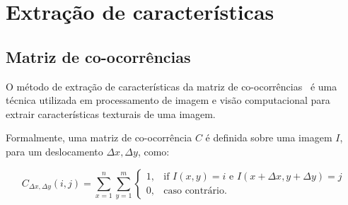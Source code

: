 \begin{figure}[h!]
        \captionsetup{width=12cm}
		\centering
\end{figure}
\FloatBarrier{}

\section{Extração de características}\label{sec:extracao-caracteristicas}

\subsection{Matriz de co-ocorrências}\label{sec:teorica-matriz-co-ocorrencia}

O método de extração de características da matriz de
co-ocorrências~\cite{haralick1979statistical} é uma técnica utilizada em
processamento de imagem e visão computacional para extrair
características texturais de uma imagem.

Formalmente, uma matriz de co-ocorrência $C$ é definida sobre uma imagem
$I$, para um deslocamento $\Delta x, \Delta y$, como:

\begin{equation}\label{eq:comatrix}
  C_{\Delta x, \Delta y}(i,j) = \sum_{x=1}^n\sum_{y=1}^m
  \begin{cases} 1, & \text{if }I(x,y)=i\text{ e }I(x+\Delta x, y+\Delta y)=j
               \\ 0, & \text{caso contrário.}
  \end{cases}
\end{equation}

